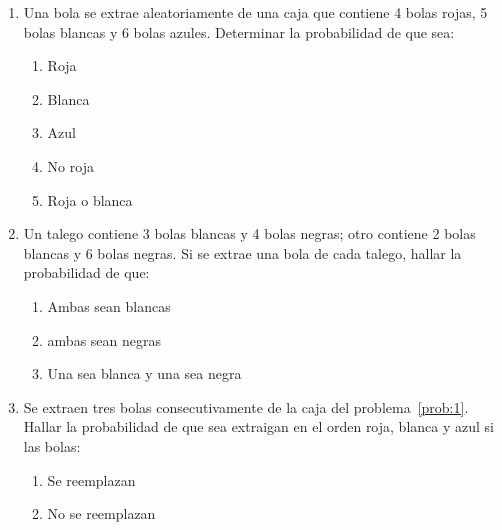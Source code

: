 \documentclass[fleqn]{article}
\begin{document}
 
\begin{enumerate}
	\item \label{prob:1} Una bola se extrae aleatoriamente de una caja que contiene 4 bolas rojas, 5 bolas blancas y 6 bolas azules. Determinar la probabilidad de que sea:
	\begin{enumerate}
	\item Roja \noanswer
	\item Blanca \noanswer
	\item Azul\noanswer
	\item No roja \noanswer
	\item Roja o blanca\noanswer
	\end{enumerate}
	\newpage
   \item Un talego contiene 3 bolas blancas y 4 bolas negras; otro contiene 2 bolas blancas y 6 bolas negras. Si se extrae una bola de cada talego, hallar la probabilidad de que:
      \begin{enumerate}
	 \item Ambas sean blancas\noanswer
	 \item ambas sean negras \noanswer
	 \item Una sea blanca y una sea negra\noanswer
      \end{enumerate}
   \item Se extraen tres bolas consecutivamente de la caja del problema~\ref{prob:1}. Hallar la probabilidad de que sea extraigan en el orden roja, blanca y azul si las bolas:
   \begin{enumerate}
   \item Se reemplazan\noanswer
   \item No se reemplazan\noanswer
   \end{enumerate}
   \end{enumerate}
\end{document}
